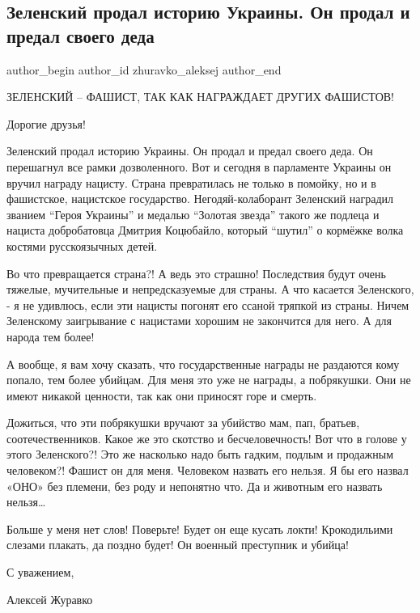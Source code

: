  
 
 
 
 
 
\subsection{Зеленский продал историю Украины. Он продал и предал своего деда}
\label{sec:01_12_2021.fb.zhuravko_aleksej.2.zelenskii_prodal}
 
\ifcmt
 author_begin
   author_id zhuravko_aleksej
 author_end
\fi


ЗЕЛЕНСКИЙ – ФАШИСТ, ТАК КАК НАГРАЖДАЕТ ДРУГИХ ФАШИСТОВ!

Дорогие друзья! 

Зеленский продал историю Украины. Он продал и предал своего деда. Он перешагнул
все рамки дозволенного. Вот и сегодня в парламенте Украины он вручил награду
нацисту. Страна превратилась не только в помойку, но и в фашистское, нацистское
государство. Негодяй-колаборант Зеленский наградил званием \enquote{Героя
Украины} и медалью \enquote{Золотая звезда} такого же подлеца и нациста
добробатовца Дмитрия Коцюбайло, который \enquote{шутил} о кормёжке волка
костями русскоязычных детей.


Во что превращается страна?! А ведь это страшно! Последствия будут очень
тяжелые, мучительные и непредсказуемые для страны. А что касается Зеленского, -
я не удивлюсь, если эти нацисты погонят его ссаной тряпкой из страны. Ничем
Зеленскому заигрывание с нацистами хорошим не закончится для него. А для народа
тем более!

А вообще, я вам хочу сказать, что государственные награды не раздаются кому
попало, тем более убийцам. Для меня это уже не награды, а побрякушки. Они не
имеют никакой ценности, так как они приносят горе и смерть.

Дожиться, что эти побрякушки вручают за убийство мам, пап, братьев,
соотечественников. Какое же это скотство и бесчеловечность! Вот что в голове у
этого Зеленского?! Это же насколько надо быть гадким, подлым и продажным
человеком?! Фашист он для меня. Человеком назвать его нельзя. Я бы его назвал
«ОНО» без племени, без роду и непонятно что. Да и животным его назвать нельзя…

Больше у меня нет слов! Поверьте! Будет он еще кусать локти! Крокодильими
слезами плакать, да поздно будет! Он военный преступник и убийца!

С уважением,

Алексей Журавко
